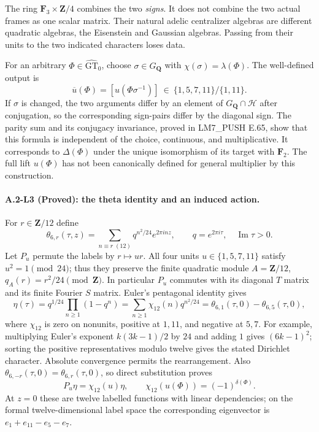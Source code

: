 The ring $\mathbf F_3\times\mathbf Z/4$ combines the two \emph{signs}.
It does not combine the two actual frames as one scalar matrix.  Their
natural adelic centralizer algebras are different quadratic algebras,
the Eisenstein and Gaussian algebras.  Passing from their units to the
two indicated characters loses data.

For an arbitrary $\Phi\in\widehat{\mathrm{GT}}_0$, choose
$\sigma\in G_{\mathbf Q}$ with $\chi(\sigma)=\lambda(\Phi)$.
The well-defined output is
\[
 \overline u(\Phi)=
 [u(\Phi\sigma^{-1})]\ \in\
 \{1,5,7,11\}/\{1,11\}.
\]
If $\sigma$ is changed, the two arguments differ by an element of
$G_{\mathbf Q}\cap\mathcal H$ after conjugation, so the corresponding
sign-pairs differ by the diagonal sign.  The parity sum and its
conjugacy invariance, proved in LM7\_PUSH E.65, show that this formula
is independent of the choice, continuous, and multiplicative.
It corresponds to $\Delta(\Phi)$ under the unique isomorphism of its
target with $\mathbf F_2$.  The full lift $u(\Phi)$ has not been
canonically defined for general multiplier by this construction.

\paragraph{A.2-L3 (Proved): the theta identity and an induced action.}
For $r\in\mathbf Z/12$ define
\[
 \theta_{6,r}(\tau,z)=
 \sum_{n\equiv r\;(12)}q^{n^2/24}e^{2\pi inz},
 \qquad q=e^{2\pi i\tau},\quad\operatorname{Im}\tau>0.
\]
Let $P_u$ permute the labels by $r\mapsto ur$.
All four units $u\in\{1,5,7,11\}$ satisfy $u^2=1\pmod{24}$;
thus they preserve the finite quadratic module
$A=\mathbf Z/12$, $q_A(r)=r^2/24\pmod{\mathbf Z}$.
In particular $P_u$ commutes with its diagonal $T$ matrix and its
finite Fourier $S$ matrix.  Euler's pentagonal identity gives
\[
 \eta(\tau)=q^{1/24}\prod_{n\ge1}(1-q^n)
 =\sum_{n\ge1}\chi_{12}(n)q^{n^2/24}
 =\theta_{6,1}(\tau,0)-\theta_{6,5}(\tau,0),
\]
where $\chi_{12}$ is zero on nonunits, positive at $1,11$, and
negative at $5,7$.  For example, multiplying Euler's exponent
$k(3k-1)/2$ by $24$ and adding $1$ gives $(6k-1)^2$;
sorting the positive representatives modulo twelve gives the stated
Dirichlet character.  Absolute convergence permits the rearrangement.
Also $\theta_{6,-r}(\tau,0)=\theta_{6,r}(\tau,0)$, so direct
substitution proves
\[
 P_u\eta=\chi_{12}(u)\eta,
 \qquad
 \chi_{12}(u(\Phi))=(-1)^{\delta(\Phi)}.
\]
At $z=0$ these are twelve labelled functions with linear dependencies;
on the formal twelve-dimensional label space the corresponding
eigenvector is $e_1+e_{11}-e_5-e_7$.

